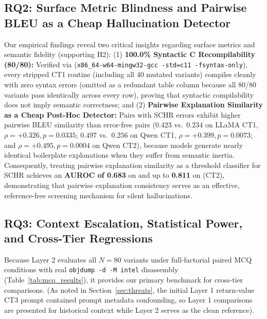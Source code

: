 \documentclass[conference]{IEEEtran}
\begin{document}
\subsection{RQ2: Surface Metric Blindness and Pairwise BLEU as a Cheap Hallucination Detector}
Our empirical findings reveal two critical insights regarding surface metrics and semantic fidelity (supporting H2): (1) \textbf{100.0\% Syntactic C Recompilability (80/80):} Verified via  (\texttt{x86\_64-w64-mingw32-gcc -std=c11 -fsyntax-only}), every stripped CT1 routine (including all 40 mutated variants) compiles cleanly with zero syntax errors (omitted as a redundant table column because all 80/80 variants pass identically across every row), proving that syntactic compilability does not imply semantic correctness; and (2) \textbf{Pairwise Explanation Similarity as a Cheap Post-Hoc Detector:} Pairs with SCHR errors exhibit higher pairwise BLEU similarity than error-free pairs ($0.423$ vs.\ $0.234$ on LLaMA CT1, $\rho = +0.326, p = 0.0335$; $0.497$ vs.\ $0.256$ on Qwen CT1, $\rho = +0.399, p = 0.0073$; and $\rho = +0.495, p = 0.0004$ on Qwen CT2), because models generate nearly identical boilerplate explanations when they suffer from semantic inertia. Consequently, treating pairwise explanation similarity as a threshold classifier for SCHR achieves an \textbf{AUROC of 0.683} on  and up to \textbf{0.811} on  (CT2), demonstrating that pairwise explanation consistency serves as an effective, reference-free screening mechanism for silent hallucinations.

\subsection{RQ3: Context Escalation, Statistical Power, and Cross-Tier Regressions}
\label{sec:rq3}
Because Layer 2 evaluates all $N=80$ variants under full-factorial paired MCQ conditions with real \texttt{objdump -d -M intel} disassembly (Table~\ref{tab:mcq_results}), it provides our primary benchmark for cross-tier comparisons. (As noted in Section~\ref{sec:threats}, the initial Layer 1 return-value CT3 prompt contained prompt metadata confounding, so Layer 1 comparisons are presented for historical context while Layer 2 serves as the clean reference).
\end{document}
